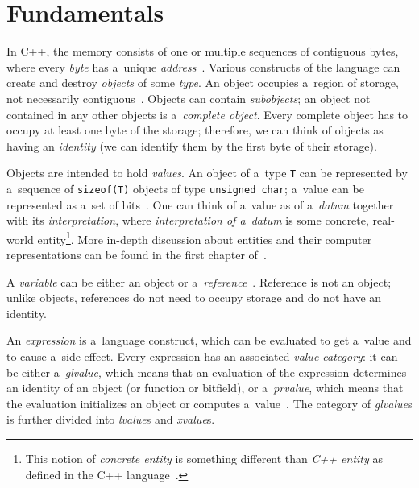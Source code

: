 \documentclass[nolot,nolof,nocover,printed]{fithesis3}
\newcommand{\stdN}[2]{\cite[#2]{#1}\xspace}
\begin{document}

\section{Fundamentals}


In C++, the memory consists of one or multiple sequences of contiguous bytes, where every \textit{byte} has a~unique \textit{address}~\stdN{n4700}{\S 4.4/1}. Various constructs of the language can create and destroy \textit{objects} of some \textit{type}. An object occupies a~region of storage, not necessarily contiguous~\stdN{n4700}{\S 4.5/1}. Objects can contain \textit{subobjects}; an object not contained in any other objects is a~\textit{complete object}. Every complete object has to occupy at least one byte of the storage; therefore, we can think of objects as having an \textit{identity} (we can identify them by the first byte of their storage).

Objects are intended to hold \textit{values}. An object of a~type \lstinline|T| can be represented by a~sequence of \lstinline|sizeof(T)| objects of type \lstinline|unsigned char|; a~value can be represented as a~set of bits~\stdN{n4296}{\S 3.9/4}.
One can think of a~value as of a~\textit{datum} together with its \textit{interpretation}, where \textit{interpretation of a~datum} is some concrete, real-world entity\footnote{This notion of \textit{concrete entity} is something different than \textit{C++ entity} as defined in the C++ language~\stdN{n4296}{\S 3/3}. }. 
More in-depth discussion about entities and their computer representations can be found in the first chapter of~\cite{progelements}.

A \textit{variable} can be either an object or a~\textit{reference}~\stdN{n4700}{\S 6/6}. Reference is not an object; unlike objects, references do not need to occupy storage and do not have an identity.

An \textit{expression} is a~language construct, which can be evaluated to get a~value and to cause a~side-effect. Every expression has an associated \textit{value category}: it can be either a~\textit{glvalue}, which means that an evaluation of the expression determines an identity of an object (or function or bitfield), or a~\textit{prvalue}, which means that the evaluation initializes an object or computes a~value~\stdN{n4700}{6.10/1}. The category of \textit{glvalue}s is further divided into \textit{lvalue}s and \textit{xvalue}s. 
\end{document}
